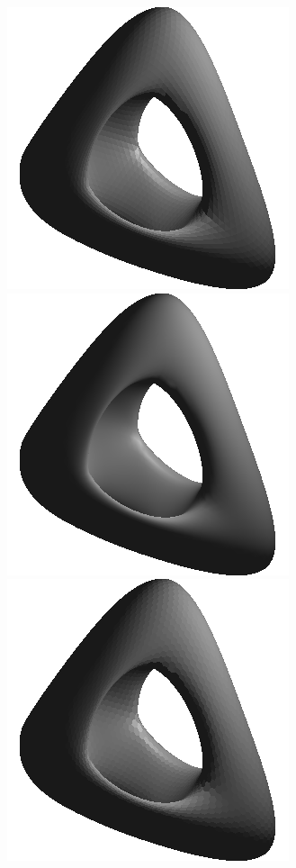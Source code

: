 \begin{figure}[!h]
    \centering
    \centering
    \includegraphics[scale=0.6]{images/genus-fs.png}
    \endminipage\hfill
    \centering
    \centering
    \includegraphics[scale=0.6]{images/genus-gs.png}
    \endminipage\hfill
    \centering
    \includegraphics[scale=0.6]{images/genus-efs.png}

\end{figure}
